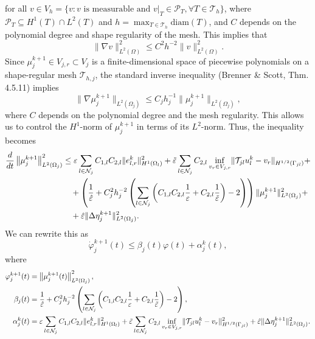 \documentclass[a4paper, 11pt]{article}
\theoremstyle{plain}
\theoremstyle{definition}
\theoremstyle{remark}
\begin{document}
for all $v\in V_{h} = \{v: v \text{ is measurable and } \left.v\right|_{T}\in \mathcal{P}_{T}, \forall T\in \mathcal{T}_{h}\}$, where $\mathcal{P}_{T}\subseteq H^{1}(T)\cap L^{2}(T)$ and $h = \max_{T\in\mathcal{T}_{h}}\text{diam}(T)$, and $C$ depends on the polynomial degree and shape regularity of the mesh. This implies that
\begin{equation*}
    \lVert \nabla v \rVert^{2}_{L^{2}(\Omega)} \leq C^{2}h^{-2}\lVert v \rVert^{2}_{L^{2}(\Omega)}.
\end{equation*}
Since $\mu_{j}^{k+1} \in V_{j,r} \subset V_j$ is a finite-dimensional space of piecewise polynomials on a shape-regular mesh $\mathcal{T}_{h,j}$, the standard inverse inequality (Brenner \& Scott, Thm. 4.5.11) implies
\begin{equation*}
    \|\nabla \mu_{j}^{k+1}\|_{L^2(\Omega_j)} \leq C_{j} h_j^{-1} \|\mu_{j}^{k+1}\|_{L^2(\Omega_j)},
\end{equation*}
where $C$ depends on the polynomial degree and the mesh regularity. This allows us to control the $H^1$-norm of $\mu_{j}^{k+1}$ in terms of its $L^2$-norm. Thus, the inequality becomes 
\begin{align*}
    \dfrac{d}{dt}\left\lVert \mu_{j}^{k+1}\right\rVert^{2}_{L^{2}(\Omega_{j})} &\leq \varepsilon\sum_{l\in \mathcal{N}_{j}}C_{1, l}C_{2, l}\lVert e_{l, r}^{k} \rVert^{2}_{H^{1}(\Omega_{l})} + \Tilde{\varepsilon}\sum_{l\in \mathcal{N}_{j}}C_{2, l}\inf_{v_{r}\in V_{j, r}}\lVert \mathcal{T}_{jl}u_{l}^{k} -  v_{r} \rVert_{H^{1/2}(\Gamma_{jl})}+\\
    &\quad + \left(\dfrac{1}{\hat{\varepsilon}} + C_{j}^{2}h^{-2}_{j}\left(\sum_{l\in \mathcal{N}_{j}}\left(C_{1, l}C_{2, l}\dfrac{1}{\varepsilon} + C_{2, l}\dfrac{1}{\Tilde{\varepsilon}}\right) - 2\right
    )\right)\lVert \mu_{j}^{k+1} \rVert^{2}_{L^{2}(\Omega_{j})}+\\
    &\quad + \hat{\varepsilon}\lVert \Delta\eta_{j}^{k+1} \rVert^{2}_{L^{2}(\Omega_{j})}.
\end{align*}
We can rewrite this as
\begin{equation*}
    \dot{\varphi}_{j}^{k+1}(t) \leq \beta_{j}(t)\varphi(t) + \alpha_{j}^{k}(t),
\end{equation*}
where
\begin{align*}
    \varphi_{j}^{k+1}(t) &= \left\lVert \mu_{j}^{k+1}(t)\right\rVert^{2}_{L^{2}(\Omega_{j})},\\
    \beta_{j}(t) &= \dfrac{1}{\hat{\varepsilon}} + C_{j}^{2}h^{-2}_{j}\left(\sum_{l\in \mathcal{N}_{j}}\left(C_{1, l}C_{2, l}\dfrac{1}{\varepsilon} + C_{2, l}\dfrac{1}{\Tilde{\varepsilon}}\right) - 2\right
    ),\\
    \alpha_{j}^{k}(t) &= \varepsilon\sum_{l\in \mathcal{N}_{j}}C_{1, l}C_{2, l}\lVert e_{l, r}^{k} \rVert^{2}_{H^{1}(\Omega_{l})} + \Tilde{\varepsilon}\sum_{l\in \mathcal{N}_{j}}C_{2, l}\inf_{v_{r}\in V_{j, r}}\lVert \mathcal{T}_{jl}u_{l}^{k} -  v_{r} \rVert^{2}_{H^{1/2}(\Gamma_{jl})} + \hat{\varepsilon}\lVert \Delta\eta_{j}^{k+1} \rVert^{2}_{L^{2}(\Omega_{j})}.
\end{align*}
\end{document}

